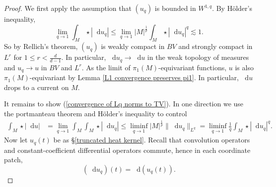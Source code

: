 \documentclass[reqno,11pt]{amsart}
\newcommand*\dif{\mathop{}\!\mathrm{d}}
\theoremstyle{definition}
\numberwithin{equation}{section}
\begin{document}
\begin{proof}
We first apply the assumption that $(u_q)$ is bounded in $W^{1, q}$.
By H\"older's inequality,
$$\lim_{q \to 1} \int_M \star |\dif u_q| \leq \lim_{q \to 1} |M|^{\frac{1}{p}} \int_M \star |\dif u_q|^q \lesssim 1.$$
So by Rellich's theorem, $(u_q)$ is weakly compact in $BV$ and strongly compact in $L^r$ for $1 \leq r < \frac{d}{d - 1}$.
In particular, $\dif u_q \to \dif u$ in the weak topology of measures and $u_q \to u$ in $BV$ and $L^r$.
As the limit of $\pi_1(M)$-equivariant functions, $u$ is also $\pi_1(M)$-equivariant by Lemma \ref{L1 convergence preserves pi1}.
In particular, $\dif u$ drops to a current on $M$.

It remains to show (\ref{convergence of Lq norms to TV}).
In one direction we use the portmanteau theorem and H\"older's inequality to control
\begin{align*}
\int_M \star |\dif u|& = \lim_{q \to 1} \int_M \int_M \star |\dif u_q| 
\leq \liminf_{q \to 1} |M|^{\frac{1}{p}} \|\dif u_q\|_{L^q} = \liminf_{q \to 1} \frac{1}{q} \int_M \star |\dif u_q|^q.
\end{align*}
Now let $u_q(t)$ be as \S\ref{truncated heat kernel}.
Recall that convolution operators and constant-coefficient differential operators commute, hence in each coordinate patch,
\begin{equation}\label{derivative solves the heat equation too}
(\dif u_q)(t) = \dif (u_q(t)).
\end{equation}


\end{proof}
\end{document}

